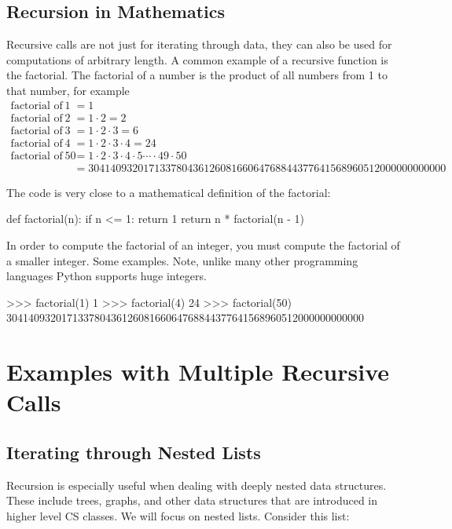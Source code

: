 \documentclass[11pt]{cselabheader}
\begin{document}
\subsection{Recursion in Mathematics}
Recursive calls are not just for iterating through data, they can also be used
for computations of arbitrary length. A common example of a recursive function
is the factorial. The factorial of a number is the product of all numbers from
1 to that number, for example
\begin{align*}
\text{factorial of } 1 &= 1
\\
\text{factorial of } 2 &= 1 \cdot 2 = 2
\\
\text{factorial of } 3 &= 1 \cdot 2 \cdot 3 = 6
\\
\text{factorial of } 4 &= 1 \cdot 2 \cdot 3 \cdot 4 = 24
\\
\text{factorial of } 50 &= 1 \cdot 2 \cdot 3 \cdot 4 \cdot 5
                         \dotsb \cdot 49 \cdot 50
\\ &= 30414093201713378043612608166064768844377641568960512000000000000
\end{align*}

The code is very close to a mathematical definition of the factorial:

\begin{python3code}
def factorial(n):
    if n <= 1:
        return 1
    return n * factorial(n - 1)
\end{python3code}

In order to compute the factorial of an integer, you must compute the
factorial of a smaller integer. Some examples. Note, unlike many other programming languages Python
supports huge integers.

\begin{pyconcode}
>>> factorial(1)
1
>>> factorial(4)
24
>>> factorial(50)
30414093201713378043612608166064768844377641568960512000000000000
\end{pyconcode}

\section{Examples with Multiple Recursive Calls}
\subsection{Iterating through Nested Lists}

Recursion is especially useful when dealing with deeply nested data structures.
These include trees, graphs, and other data structures that are introduced in
higher level CS classes. We will focus on nested lists. Consider this list:
\end{document}
